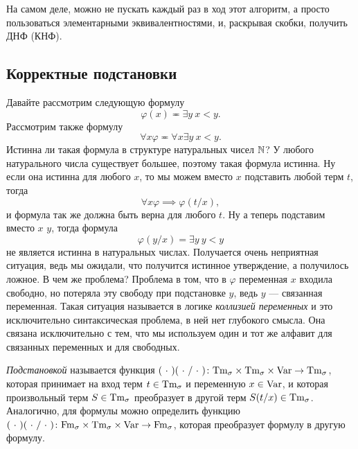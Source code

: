 На самом деле, можно не пускать каждый раз в ход этот алгоритм, а просто пользоваться элементарными эквивалентностями, и, раскрывая скобки, получить ДНФ (КНФ).

\subsection{Корректные подстановки}

Давайте рассмотрим следующую формулу
$$
    \varphi(x) \eqcirc \exists y~ x < y.
$$
Рассмотрим также формулу
$$
    \forall x \varphi \eqcirc \forall x \exists y~ x < y.
$$
Истинна ли такая формула в структуре натуральных чисел $\mathbb{N}$?
У любого натурального числа существует большее, поэтому такая формула истинна.
Ну если она истинна для любого $x$, то мы можем вместо $x$ подставить любой терм $t$, тогда
$$
    \forall x \varphi \implies \varphi(t/x),
$$
и формула так же должна быть верна для любого $t$.
Ну а теперь подставим вместо $x$ $y$, тогда формула
$$
    \varphi(y/x) = \exists y~ y < y
$$
не является истинна в натуральных числах.
Получается очень неприятная ситуация, ведь мы ожидали, что получится истинное утверждение, а получилось ложное.
В чем же проблема?
Проблема в том, что в $\varphi$ переменная $x$ входила свободно, но потеряла эту свободу при подстановке $y$, ведь $y$ --- связанная переменная.
Такая ситуация называется в логике {\it коллизией переменных} и это исключительно синтаксическая проблема, в ней нет глубокого смысла.
Она связана исключительно с тем, что мы используем один и тот же алфавит для связанных переменных и для свободных.

\begin{definition}
    {\it Подстановкой} называется функция $(~\cdot~)(~\cdot~/~\cdot~) \colon \mathrm{Tm}_{\sigma} \times \mathrm{Tm}_{\sigma} \times \mathrm{Var} \to \mathrm{Tm}_{\sigma}$, которая принимает на вход терм $t \in \mathrm{Tm}_{\sigma}$ и переменную $x \in \mathrm{Var}$, и которая произвольный терм $S \in \mathrm{Tm}_{\sigma}$ преобразует в другой терм $S(t/x) \in \mathrm{Tm}_{\sigma}$.
    Аналогично, для формулы можно определить функцию $(~\cdot~)(~\cdot~/~\cdot~) \colon \mathrm{Fm}_{\sigma} \times \mathrm{Tm}_{\sigma} \times \mathrm{Var} \to \mathrm{Fm}_{\sigma}$, которая преобразует формулу в другую формулу.
\end{definition}

